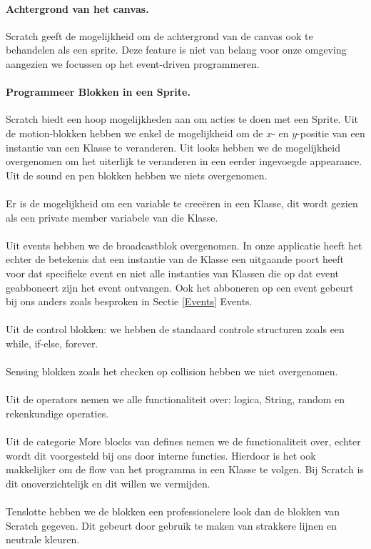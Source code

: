 \documentclass[]{article}
\begin{document}
\paragraph{Achtergrond van het canvas.}
Scratch geeft de mogelijkheid om de achtergrond van de canvas ook te behandelen als een sprite. Deze feature is niet van belang voor onze omgeving aangezien we focussen op het event-driven programmeren.
\paragraph{Programmeer Blokken in een Sprite.}
Scratch biedt een hoop mogelijkheden aan om acties te doen met een Sprite. Uit de motion-blokken hebben we enkel de mogelijkheid om de $x$- en $y$-positie van een instantie van een Klasse te veranderen. Uit looks hebben we de mogelijkheid overgenomen om het uiterlijk te veranderen in een eerder ingevoegde appearance. Uit de sound en pen blokken hebben we niets overgenomen.\\\\ Er is de mogelijkheid om een variable te cree\"{e}ren in een Klasse, dit wordt gezien als een private member variabele van die Klasse. \\\\ Uit events hebben we de broadcastblok overgenomen. In onze applicatie heeft het echter de betekenis dat een instantie van de Klasse een uitgaande poort heeft voor dat specifieke event en niet alle instanties van Klassen die op dat event geabboneert zijn het event ontvangen. Ook het abboneren op een event gebeurt bij ons anders zoals besproken in Sectie \ref{Events} Events.\\\\ Uit de control blokken: we hebben de standaard controle structuren zoals een while, if-else, forever.
\\\\Sensing blokken zoals het checken op collision hebben we niet overgenomen.
\\\\ Uit de operators nemen we alle functionaliteit over: logica, String, random en rekenkundige operaties.
\\\\ Uit de categorie More blocks van defines nemen we de functionaliteit over, echter wordt dit voorgesteld bij ons door interne functies. Hierdoor is het ook makkelijker om de flow van het programma in een Klasse te volgen. Bij Scratch is dit onoverzichtelijk en dit willen we vermijden.\\\\
Tenslotte hebben we de blokken een professionelere look dan de blokken van Scratch gegeven. Dit gebeurt door gebruik te maken van strakkere lijnen en neutrale kleuren.
 
\end{document}

